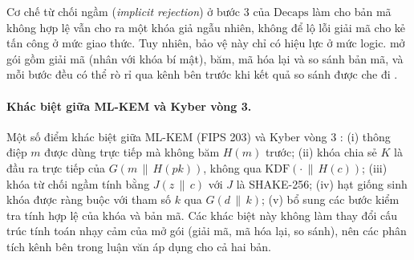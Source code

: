 \documentclass[../LuanVan.tex]{subfiles}
\begin{document}
\begin{center}
\end{center}

Cơ chế từ chối ngầm (\textit{implicit rejection}) ở bước 3 của $\mathrm{Decaps}$ làm cho bản mã không hợp lệ vẫn cho ra một khóa giả ngẫu nhiên, không để lộ lỗi giải mã cho kẻ tấn công ở mức giao thức. Tuy nhiên, bảo vệ này chỉ có hiệu lực ở mức logic. mở gói gồm giải mã (nhân với khóa bí mật), băm, mã hóa lại và so sánh bản mã, và mỗi bước đều có thể rò rỉ qua kênh bên trước khi kết quả so sánh được che đi \cite{Ravi20,Ueno22}.

\paragraph{Khác biệt giữa ML-KEM và Kyber vòng 3.} Một số điểm khác biệt giữa ML-KEM (FIPS 203) và Kyber vòng 3 \cite{FIPS203,Avanzi21}: (i) thông điệp $m$ được dùng trực tiếp mà không băm $H(m)$ trước; (ii) khóa chia sẻ $K$ là đầu ra trực tiếp của $G(m\,\|\,H(pk))$, không qua $\mathrm{KDF}(\cdot\,\|\,H(c))$; (iii) khóa từ chối ngầm tính bằng $J(z\,\|\,c)$ với $J$ là SHAKE-256; (iv) hạt giống sinh khóa được ràng buộc với tham số $k$ qua $G(d\,\|\,k)$; (v) bổ sung các bước kiểm tra tính hợp lệ của khóa và bản mã. Các khác biệt này không làm thay đổi cấu trúc tính toán nhạy cảm của mở gói (giải mã, mã hóa lại, so sánh), nên các phân tích kênh bên trong luận văn áp dụng cho cả hai bản.
\end{document}
